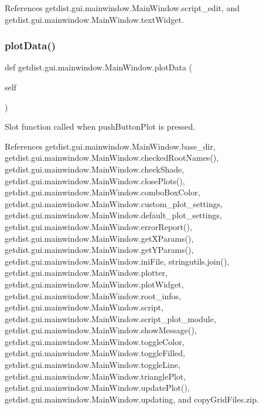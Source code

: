 References getdist.\+gui.\+mainwindow.\+Main\+Window.\+script\+\_\+edit, and getdist.\+gui.\+mainwindow.\+Main\+Window.\+text\+Widget.

\mbox{\label{classgetdist_1_1gui_1_1mainwindow_1_1MainWindow_ae498c95f48e909b62f663f16d824e941}} 
\subsubsection{\texorpdfstring{plot\+Data()}{plotData()}}
{\footnotesize\ttfamily def getdist.\+gui.\+mainwindow.\+Main\+Window.\+plot\+Data (\begin{DoxyParamCaption}\item[{}]{self }\end{DoxyParamCaption})}

\begin{DoxyVerb}Slot function called when pushButtonPlot is pressed.
\end{DoxyVerb}
 

References getdist.\+gui.\+mainwindow.\+Main\+Window.\+base\+\_\+dir, getdist.\+gui.\+mainwindow.\+Main\+Window.\+checked\+Root\+Names(), getdist.\+gui.\+mainwindow.\+Main\+Window.\+check\+Shade, getdist.\+gui.\+mainwindow.\+Main\+Window.\+close\+Plots(), getdist.\+gui.\+mainwindow.\+Main\+Window.\+combo\+Box\+Color, getdist.\+gui.\+mainwindow.\+Main\+Window.\+custom\+\_\+plot\+\_\+settings, getdist.\+gui.\+mainwindow.\+Main\+Window.\+default\+\_\+plot\+\_\+settings, getdist.\+gui.\+mainwindow.\+Main\+Window.\+error\+Report(), getdist.\+gui.\+mainwindow.\+Main\+Window.\+get\+X\+Params(), getdist.\+gui.\+mainwindow.\+Main\+Window.\+get\+Y\+Params(), getdist.\+gui.\+mainwindow.\+Main\+Window.\+ini\+File, stringutils.\+join(), getdist.\+gui.\+mainwindow.\+Main\+Window.\+plotter, getdist.\+gui.\+mainwindow.\+Main\+Window.\+plot\+Widget, getdist.\+gui.\+mainwindow.\+Main\+Window.\+root\+\_\+infos, getdist.\+gui.\+mainwindow.\+Main\+Window.\+script, getdist.\+gui.\+mainwindow.\+Main\+Window.\+script\+\_\+plot\+\_\+module, getdist.\+gui.\+mainwindow.\+Main\+Window.\+show\+Message(), getdist.\+gui.\+mainwindow.\+Main\+Window.\+toggle\+Color, getdist.\+gui.\+mainwindow.\+Main\+Window.\+toggle\+Filled, getdist.\+gui.\+mainwindow.\+Main\+Window.\+toggle\+Line, getdist.\+gui.\+mainwindow.\+Main\+Window.\+triangle\+Plot, getdist.\+gui.\+mainwindow.\+Main\+Window.\+update\+Plot(), getdist.\+gui.\+mainwindow.\+Main\+Window.\+updating, and copy\+Grid\+Files.\+zip.



